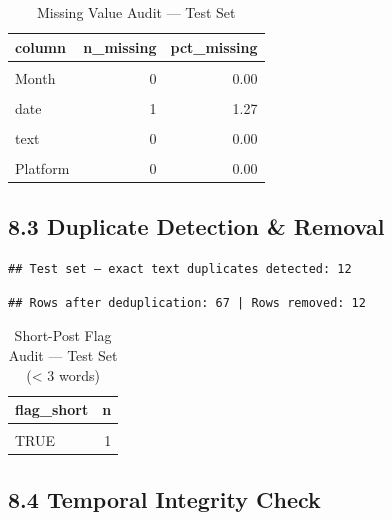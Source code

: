 \documentclass[
]{article}
\begin{document}
\begin{longtable}[t]{lrr}
\caption{\label{tab:test-missing}Missing Value Audit — Test Set}\\
\toprule
column & n\_missing & pct\_missing\\
\midrule
\cellcolor{gray!10}{Year} & \cellcolor{gray!10}{1} & \cellcolor{gray!10}{1.27}\\
Month & 0 & 0.00\\
\cellcolor{gray!10}{Day} & \cellcolor{gray!10}{0} & \cellcolor{gray!10}{0.00}\\
date & 1 & 1.27\\
\cellcolor{gray!10}{Time of Tweet} & \cellcolor{gray!10}{0} & \cellcolor{gray!10}{0.00}\\
\addlinespace
text & 0 & 0.00\\
\cellcolor{gray!10}{sentiment} & \cellcolor{gray!10}{79} & \cellcolor{gray!10}{100.00}\\
Platform & 0 & 0.00\\
\bottomrule
\end{longtable}

\subsection{8.3 Duplicate Detection \&
Removal}\label{duplicate-detection-removal-1}

\begin{verbatim}
## Test set — exact text duplicates detected: 12
\end{verbatim}

\begin{verbatim}
## Rows after deduplication: 67 | Rows removed: 12
\end{verbatim}

\begin{longtable}[t]{lr}
\caption{\label{tab:test-duplicates}Short-Post Flag Audit — Test Set (< 3 words)}\\
\toprule
flag\_short & n\\
\midrule
\cellcolor{gray!10}{FALSE} & \cellcolor{gray!10}{66}\\
TRUE & 1\\
\bottomrule
\end{longtable}

\subsection{8.4 Temporal Integrity
Check}\label{temporal-integrity-check-1}
\end{document}

